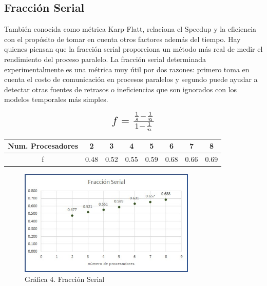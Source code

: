 \documentclass{report}
\begin{document}
\clearpage
\subsection*{Fracción Serial}
\noindent También conocida como métrica Karp-Flatt, relaciona el  Speedup y la eficiencia con el propósito de tomar en cuenta otros factores además del tiempo. Hay quienes piensan que la fracción serial proporciona un método más real de medir el rendimiento del proceso paralelo. La fracción serial determinada experimentalmente es una métrica muy útil por dos razones: primero toma en cuenta el costo de comunicación en procesos paralelos y segundo puede ayudar a detectar otras fuentes de retrasos o ineficiencias que son ignorados con los modelos temporales más simples. \medskip

\begin{equation*}
    \scalebox{1.5}{$f = \frac{\frac{1}{s} - \frac{1}{n}}{1-\frac{1}{n}}$}
\end{equation*}

\vspace{0.2cm}

\begin{center}
    \begin{tabular}{|c|c|c|c|c|c|c|c|}
        \hline
           Num. Procesadores  & 2 & 3 & 4 & 5 & 6 & 7 & 8 \\
        \hline
            f & 0.48 & 0.52 & 0.55 & 0.59 & 0.68 & 0.66 & 0.69 \\
        \hline
    \end{tabular}
\end{center}

\vspace{0.3cm}

\begin{figure}[h!]
    \centering
    \includegraphics[width = 0.75\textwidth]{Images/fraccionSerial.jpeg}
    \caption{Gráfica 4. Fracción Serial}
\end{figure}
\end{document}
